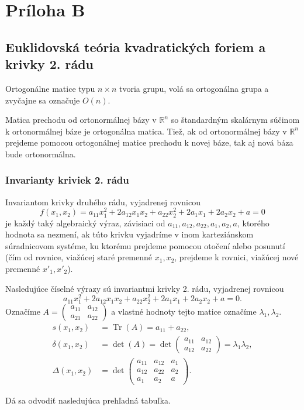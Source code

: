 \chapter{Príloha B}
\label{pri:priloha2}
\section{Euklidovská teória kvadratických foriem a krivky 2. rádu}
\begin{theorem}
Ortogonálne matice typu $n \times n $ tvoria grupu, volá sa ortogonálna
grupa a zvyčajne sa označuje $O(n)$.
\end{theorem}

\begin{theorem} 
Matica prechodu od ortonormálnej bázy v $\mathbb{R}^n$ so štandardným skalárnym súčinom k ortonormálnej báze je ortogonálna matica. Tiež, ak od ortonormálnej bázy v $\mathbb{R}^n$ prejdeme pomocou ortogonálnej matice prechodu k novej báze,
tak aj nová báza bude ortonormálna.
\end{theorem}

\subsection{Invarianty kriviek 2. rádu}
\begin{definition}
Invariantom krivky druhého rádu, vyjadrenej rovnicou
$$
f(x_1, x_2) = a_{11}x_1^2 + 2a_{12}x_1x_2 + a_{22}x_2^2 + 2a_1x_1 + 2a_2x_2 + a = 0
$$
je každý taký algebraický výraz, závisiaci od \(a_{11}, a_{12}, a_{22}, a_1, a_2, a\), ktorého hodnota sa nezmení, ak túto krivku vyjadríme v inom karteziánskom súradnicovom
systéme, ku ktorému prejdeme pomocou otočení alebo posunutí (čím od rovnice,
viažúcej staré premenné \(x_1, x_2\), prejdeme k rovnici, viažúcej nové premenné
\(x'_{1}, x'_{2}\)).
\end{definition}

\begin{theorem}
Nasledujúce číselné výrazy sú invariantmi krivky 2. rádu, vyjadrenej rovnicou
\[ a_{11}x_1^2 + 2a_{12}x_1x_2 + a_{22}x_2^2 + 2a_1x_1 + 2a_2x_2 + a = 0. \]
Označíme 
\(A = \begin{pmatrix} a_{11} & a_{12} \\ a_{21} & a_{22} \end{pmatrix}\)
 a vlastné hodnoty tejto matice označíme \(\lambda_1, \lambda_2\).
\begin{align*}
s(x_1,x_2) &= \operatorname{Tr}(A) = a_{11} + a_{22}, \\
\delta(x_1,x_2) &= \det(A) = \det \begin{pmatrix} a_{11} & a_{12} \\ a_{12} & a_{22} \end{pmatrix} = \lambda_1 \lambda_2, \\
\Delta(x_1,x_2) &= \det \begin{pmatrix} a_{11} & a_{12} & a_1 \\ a_{12} & a_{22} & a_2 \\ a_1 & a_2 & a \end{pmatrix}.
\end{align*}
\end{theorem}
Dá sa odvodiť nasledujúca prehľadná tabuľka.

